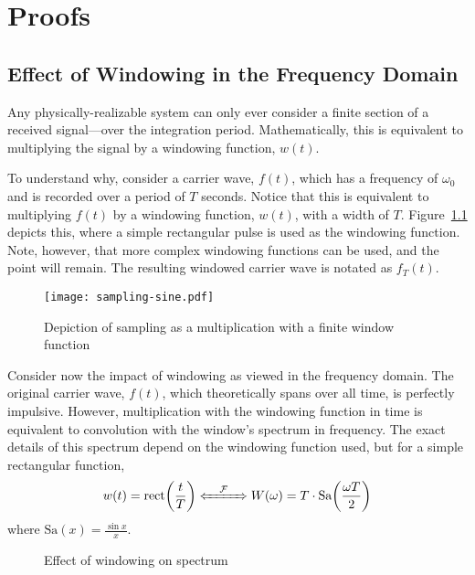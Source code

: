 \documentclass[class=report,11pt,crop=false]{standalone}
\begin{document}
\chapter{Proofs}

\section{Effect of Windowing in the Frequency Domain}

Any physically-realizable system can only ever consider a finite section of a received signal---over the integration period. Mathematically, this is equivalent to multiplying the signal by a windowing function, \(w(t)\).

To understand why, consider a carrier wave, \(f(t)\), which has a frequency of \(\omega_0\) and is recorded over a period of \(T\) seconds. Notice that this is equivalent to multiplying \(f(t)\) by a windowing function, \(w(t)\), with a width of \(T\). Figure~\ref{fig:sampling-sine} depicts this, where a simple rectangular pulse is used as the windowing function. Note, however, that more complex windowing functions can be used, and the point will remain. The resulting windowed carrier wave is notated as \(f_T(t)\).

\begin{figure}[htbp]
    \centering
    \captionsetup{type=figure}
    \texttt{[image: sampling-sine.pdf]}
    \caption{Depiction of sampling as a multiplication with a finite window function}
    \label{fig:sampling-sine}
\end{figure}

Consider now the impact of windowing as viewed in the frequency domain. The original carrier wave, \(f(t)\), which theoretically spans over all time, is perfectly impulsive. However, multiplication with the windowing function in time is equivalent to convolution with the window's spectrum in frequency. The exact details of this spectrum depend on the windowing function used, but for a simple rectangular function,
\begin{equation}
    w(t) = \textrm{rect}\bigg(\frac{t}{T}\bigg) \xLeftrightarrow{\quad\mathcal{F}\quad} W(\omega) = T \cdot \textrm{Sa}\bigg(\frac{\omega T}{2}\bigg)
\end{equation}
where \(\textrm{Sa}(x)=\frac{\sin{x}}{x}\).

\begin{figure}[htbp]
    \centering
    \captionsetup{type=figure}
    \def\svgwidth{\linewidth}
    { %
        }
    \caption{Effect of windowing on spectrum}
    \label{fig:sampling-sine-freq}
\end{figure}
\end{document}
